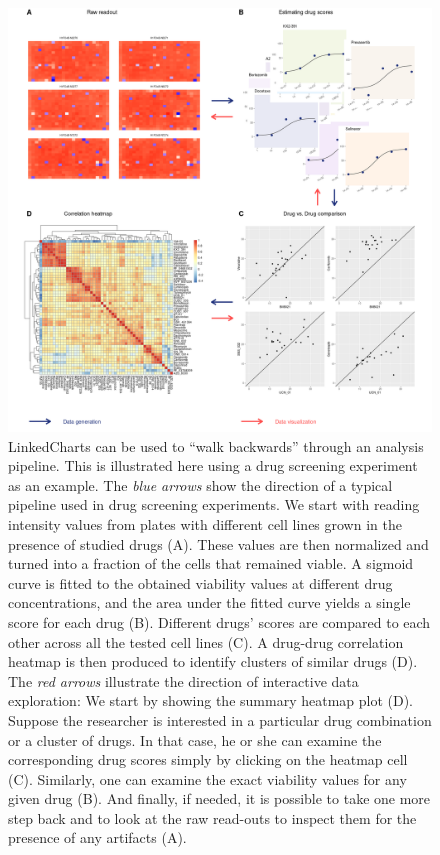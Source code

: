 \documentclass[twocolumn,10pt]{article}
\begin{document}
\begin{figure}
  \includegraphics[width=\textwidth]{FigC/figC.png}
  \caption{LinkedCharts can be used to ``walk backwards'' through an analysis pipeline. This is illustrated here using a drug screening experiment \citep{he_2018} as an example. The \emph{blue arrows} show the direction of a typical pipeline used in drug screening experiments. We start with reading intensity values from plates with different cell lines grown in the presence of studied drugs (A). These values are then normalized and turned into a fraction of the cells that remained viable. A sigmoid curve is fitted to the obtained viability values at different drug concentrations, and the area under the fitted curve yields a single score for each drug (B). Different drugs' scores are compared to each other across all the tested cell lines (C). A drug-drug correlation heatmap is then produced to identify clusters of similar drugs (D). The \emph{red arrows} illustrate the direction of interactive data exploration: We start by showing the summary heatmap plot (D). Suppose the researcher is interested in a particular drug combination or a cluster of drugs. In that case, he or she can examine the corresponding drug scores simply by clicking on the heatmap cell (C). Similarly, one can examine the exact viability values for any given drug (B). And finally, if needed, it is possible to take one more step back and to look at the raw read-outs to inspect them for the presence of any artifacts (A).}
  \label{FigC}
\end{figure}
\end{document}
